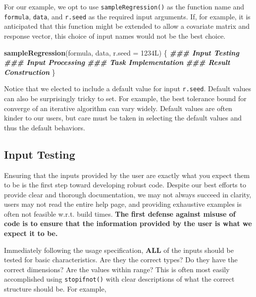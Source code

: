 \documentclass[
]{book}
\newenvironment{Shaded}{\begin{snugshade}}{\end{snugshade}}
\newcommand{\AttributeTok}[1]{\textcolor[rgb]{0.13,0.29,0.53}{#1}}
\newcommand{\DocumentationTok}[1]{\textcolor[rgb]{0.56,0.35,0.01}{\textbf{\textit{#1}}}}
\newcommand{\FunctionTok}[1]{\textcolor[rgb]{0.13,0.29,0.53}{\textbf{#1}}}
\newcommand{\NormalTok}[1]{#1}
\begin{document}
For our example, we opt to use \texttt{sampleRegression()} as the function name and \texttt{formula}, \texttt{data}, and \texttt{r.seed} as the required input arguments. If, for example, it is anticipated that this function might be extended to allow a covariate matrix and response vector, this choice of input names would not be the best choice.

\begin{Shaded}
\begin{Highlighting}[]
\FunctionTok{sampleRegression}\NormalTok{(formula, data, }\AttributeTok{r.seed =}\NormalTok{ 1234L) \{}
  \DocumentationTok{\#\#\# Input Testing}
  \DocumentationTok{\#\#\# Input Processing}
  \DocumentationTok{\#\#\# Task Implementation}
  \DocumentationTok{\#\#\# Result Construction}
\NormalTok{\}}
\end{Highlighting}
\end{Shaded}

Notice that we elected to include a default value for input \texttt{r.seed}. Default values can also be surprisingly tricky to set. For example, the best tolerance bound for converge of an iterative algorithm can vary widely. Default values are often kinder to our users, but care must be taken in selecting the default values and thus the default behaviors.

\hypertarget{input-testing}{%
\subsection{Input Testing}\label{input-testing}}

Ensuring that the inputs provided by the user are exactly what you expect them to be is the first step toward developing robust code. Despite our best efforts to provide clear and thorough documentation, we may not always succeed in clarity, users may not read the entire help page, and providing exhaustive examples is often not feasible w.r.t. build times. \textbf{The first defense against misuse of code is to ensure that the information provided by the user is what we expect it to be.}

Immediately following the usage specification, \textbf{ALL} of the inputs should be tested for basic characteristics. Are they the correct types? Do they have the correct dimensions? Are the values within range? This is often most easily accomplished using \texttt{stopifnot()} with clear descriptions of what the correct structure should be. For example,
\end{document}
